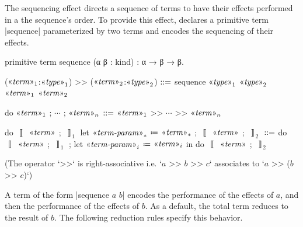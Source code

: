 The sequencing effect directs a sequence of terms to have their effects performed in a the sequence's order.
To provide this effect, \LangB declares a primitive term \code|sequence| parameterized by two terms and encodes the sequencing of their effects.
%
\begin{program}[caption={Primitive for sequencing}]
primitive term sequence (α β : kind) : α → β → β.
\end{program}
%
\begin{notational}[caption={Notations for sequencing}]
($\mvar{term}_1$:$\mvar{type}_1$) >> ($\mvar{term}_2$:$\mvar{type}_2$)
  $\syneq$
    sequence $\mvar{type}_1$ $\mvar{type}_2$ $\mvar{term}_1$ $\mvar{term}_2$

do{ $\mvar{term}_1$ ; $\cdots$ ; $\mvar{term}_n$ }
  $\syneq$
    $\mvar{term}_1$ >> $\cdots$ >> $\mvar{term}_n$

do{ $〚$ $\mvar{term}$ ; $〛_1$ let $\mvar{term-param}_*$ ≔ $\mvar{term}_*$ ; $〚$ $\mvar{term}$ ; $〛_2$ }
  $\syneq$
    do{ $〚$ $\mvar{term}$ ; $〛_1$ ; let $\mvar{term-param}_i$ ≔ $\mvar{term}_i$ in do{ $〚$ $\mvar{term}$ ; $〛_2$ } }
\end{notational}
%
(The operator \code`>>` is right-associative i.e.
\code`$a$ >> $b$ >> $c$` associates to \code`$a$ >> ($b$ >> $c$)`)

A term of the form \code|sequence $a$ $b$| encodes the performance of the effects of $a$, and then the performance of the effects of $b$.
As a default, the total term reduces to the result of $b$.
The following reduction rules specify this behavior.
%



